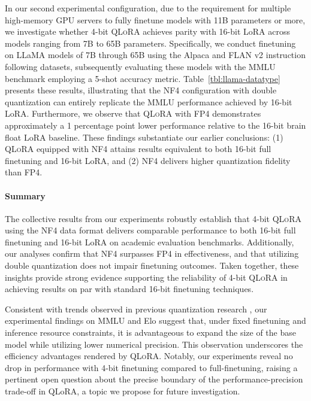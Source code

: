 In our second experimental configuration, due to the requirement for multiple high-memory GPU servers to fully finetune models with 11B parameters or more, we investigate whether 4-bit \textsc{QLoRA} achieves parity with 16-bit LoRA across models ranging from 7B to 65B parameters. Specifically, we conduct finetuning on LLaMA models of 7B through 65B using the Alpaca and FLAN v2 instruction following datasets, subsequently evaluating these models with the MMLU benchmark employing a 5-shot accuracy metric. Table~\ref{tbl:llama-datatype} presents these results, illustrating that the NF4 configuration with double quantization can entirely replicate the MMLU performance achieved by 16-bit LoRA. Furthermore, we observe that \textsc{QLoRA} with FP4 demonstrates approximately a 1 percentage point lower performance relative to the 16-bit brain float LoRA baseline. These findings substantiate our earlier conclusions: (1) \textsc{QLoRA} equipped with NF4 attains results equivalent to both 16-bit full finetuning and 16-bit LoRA, and (2) NF4 delivers higher quantization fidelity than FP4.

\paragraph{Summary} The collective results from our experiments robustly establish that 4-bit \textsc{QLoRA} using the NF4 data format delivers comparable performance to both 16-bit full finetuning and 16-bit LoRA on academic evaluation benchmarks. Additionally, our analyses confirm that NF4 surpasses FP4 in effectiveness, and that utilizing double quantization does not impair finetuning outcomes. Taken together, these insights provide strong evidence supporting the reliability of 4-bit \textsc{QLoRA} in achieving results on par with standard 16-bit finetuning techniques.

Consistent with trends observed in previous quantization research \citep{dettmers2022case}, our experimental findings on MMLU and Elo suggest that, under fixed finetuning and inference resource constraints, it is advantageous to expand the size of the base model while utilizing lower numerical precision. This observation underscores the efficiency advantages rendered by \textsc{QLoRA}. Notably, our experiments reveal no drop in performance with 4-bit finetuning compared to full-finetuning, raising a pertinent open question about the precise boundary of the performance-precision trade-off in QLoRA, a topic we propose for future investigation.

